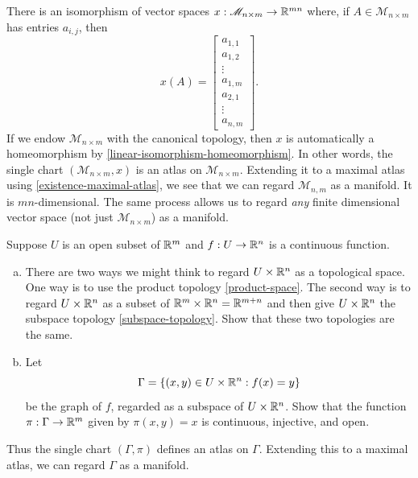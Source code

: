 \begin{example}[Matrices]
	There is an isomorphism of vector spaces $x : \mathscr{M}_{n \times m} \to \mathbb{R}^{mn}$ where, if $A \in \mathscr{M}_{n \times m}$ has entries $a_{i,j}$, then
	\[ x(A) = \begin{bmatrix} a_{1,1} \\ a_{1,2} \\ \vdots \\ a_{1,m} \\ a_{2,1} \\ \vdots \\ a_{n,m} \end{bmatrix}. \]
	If we endow $\mathscr{M}_{n \times m}$ with the canonical topology, then $x$ is automatically a homeomorphism by \cref{linear-isomorphism-homeomorphism}. In other words, the single chart $(\mathscr{M}_{n \times m}, x)$ is an atlas on $\mathscr{M}_{n \times m}$. Extending it to a maximal atlas using \cref{existence-maximal-atlas}, we see that we can regard $\mathscr{M}_{n,m}$ as a manifold. It is $mn$-dimensional. The same process allows us to regard \emph{any} finite dimensional vector space (not just $\mathscr{M}_{n \times m}$) as a manifold.  
\end{example}

\begin{exercise} \label{graphs-continuous}
	Suppose $U$ is an open subset of $\mathbb{R}^m$ and $f : U \to \mathbb{R}^n$ is a continuous function. 
	\begin{enumerate}[(a)]
		\item There are two ways we might think to regard $U \times \mathbb{R}^n$ as a topological space. One way is to use the product topology \ref{product-space}. The second way is to regard $U \times \mathbb{R}^n$ as a subset of $\mathbb{R}^m \times \mathbb{R}^n = \mathbb{R}^{m+n}$ and then give $U \times \mathbb{R}^n$ the subspace topology \ref{subspace-topology}. Show that these two topologies are the same. 
		
		\item Let
		\[ \Gamma = \{ (x,y) \in U \times \mathbb{R}^n : f(x) = y \} \]
		be the graph of $f$, regarded as a subspace of $U \times \mathbb{R}^n$. Show that the function $\pi : \Gamma \to \mathbb{R}^m$ given by $\pi(x,y) = x$ is continuous, injective, and open. 
	\end{enumerate}
	Thus the single chart $(\Gamma, \pi)$ defines an atlas on $\Gamma$. Extending this to a maximal atlas, we can regard $\Gamma$ as a manifold. 
\end{exercise}

